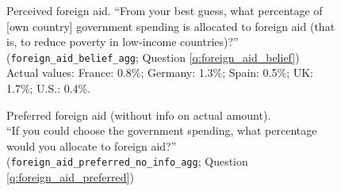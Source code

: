 \begin{figure}[h!]
    \cprotect\caption[Perceived foreign aid]{Perceived foreign aid. ``From your best guess, what percentage of [own country] government spending is allocated to foreign aid (that is, to reduce poverty in low-income countries)?'' (\verb|foreign_aid_belief_agg|; Question \ref{q:foreign_aid_belief})  %
    \\ Actual values: France: 0.8\%; Germany: 1.3\%; Spain: 0.5\%; UK: 1.7\%; U.S.: 0.4\%.}\label{fig:foreign_aid_belief}
\end{figure}

\begin{figure}[h!]
    \cprotect\caption[Preferred foreign aid (without info on actual amount)]{Preferred foreign aid (without info on actual amount). \\ ``If you could choose the government spending, what percentage would you allocate
    to foreign aid?'' (\verb|foreign_aid_preferred_no_info_agg|; Question \ref{q:foreign_aid_preferred})  %
    }\label{fig:foreign_aid_preferred_no_info}
\end{figure}

